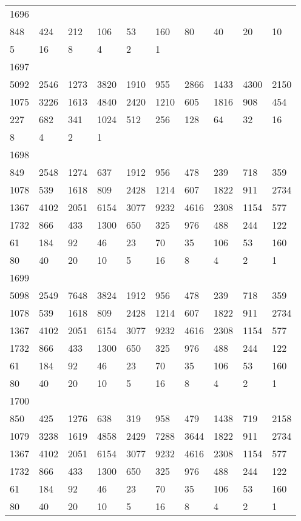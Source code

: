 \begin{longtable}{*{10}{l}}
1696&&&&&&&&&\\
848& 424& 212& 106& 53& 160& 80& 40& 20& 10\\
5& 16& 8& 4& 2& 1& \\

1697&&&&&&&&&\\
5092& 2546& 1273& 3820& 1910& 955& 2866& 1433& 4300& 2150\\
1075& 3226& 1613& 4840& 2420& 1210& 605& 1816& 908& 454\\
227& 682& 341& 1024& 512& 256& 128& 64& 32& 16\\
8& 4& 2& 1& \\

1698&&&&&&&&&\\
849& 2548& 1274& 637& 1912& 956& 478& 239& 718& 359\\
1078& 539& 1618& 809& 2428& 1214& 607& 1822& 911& 2734\\
1367& 4102& 2051& 6154& 3077& 9232& 4616& 2308& 1154& 577\\
1732& 866& 433& 1300& 650& 325& 976& 488& 244& 122\\
61& 184& 92& 46& 23& 70& 35& 106& 53& 160\\
80& 40& 20& 10& 5& 16& 8& 4& 2& 1\\

1699&&&&&&&&&\\
5098& 2549& 7648& 3824& 1912& 956& 478& 239& 718& 359\\
1078& 539& 1618& 809& 2428& 1214& 607& 1822& 911& 2734\\
1367& 4102& 2051& 6154& 3077& 9232& 4616& 2308& 1154& 577\\
1732& 866& 433& 1300& 650& 325& 976& 488& 244& 122\\
61& 184& 92& 46& 23& 70& 35& 106& 53& 160\\
80& 40& 20& 10& 5& 16& 8& 4& 2& 1\\

1700&&&&&&&&&\\
850& 425& 1276& 638& 319& 958& 479& 1438& 719& 2158\\
1079& 3238& 1619& 4858& 2429& 7288& 3644& 1822& 911& 2734\\
1367& 4102& 2051& 6154& 3077& 9232& 4616& 2308& 1154& 577\\
1732& 866& 433& 1300& 650& 325& 976& 488& 244& 122\\
61& 184& 92& 46& 23& 70& 35& 106& 53& 160\\
80& 40& 20& 10& 5& 16& 8& 4& 2& 1\\


\end{longtable}
